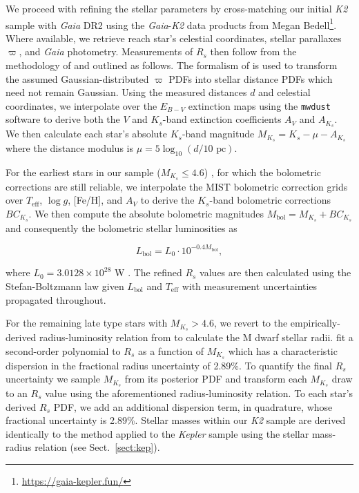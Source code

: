 \documentclass[twocolumn]{emulateapj}
\newcommand{\gaia}[1]{\emph{Gaia}#1}
\newcommand{\kepler}[1]{\emph{Kepler}#1}
\newcommand{\ktwo}[1]{\emph{K2}#1}
\newcommand{\teff}[1]{$T_{\text{eff}}$#1}
\newcommand{\logg}[1]{$\log{g}$#1}
\begin{document}
We proceed with refining the stellar parameters by cross-matching our initial \ktwo{} sample with \gaia{}  
DR2 using the \gaia{-}\ktwo{} data products from Megan Bedell\footnote{\url{https://gaia-kepler.fun/}}. Where
available, we retrieve reach star's celestial coordinates, stellar parallaxes $\varpi$, and \gaia{} photometry.
Measurements of $R_s$ then follow from the methodology of \cite{berger18} and outlined as follows.
The formalism of \cite{bailerjones18} is used to transform the assumed
Gaussian-distributed $\varpi$ PDFs into stellar distance PDFs which need not remain Gaussian.
Using the measured distances $d$ and celestial coordinates, we interpolate over the $E_{B-V}$ extinction maps using the
\texttt{mwdust} software \citep{bovy16} to derive both the $V$ and $K_s$-band extinction coefficients $A_V$ and
$A_{K_s}$. We then calculate each star's absolute $K_s$-band magnitude $M_{K_s} = K_s - \mu - A_{K_s}$ where
the distance modulus is $\mu = 5\log_{10}(d/10\text{ pc})$.

For the earliest stars in our sample ($M_{K_s}\leq 4.6$) , for which the bolometric corrections
are still reliable, we interpolate the MIST bolometric correction grids \citep{choi16} over \teff{,} \logg{,} [Fe/H],
and $A_V$ to derive the $K_s$-band bolometric corrections $BC_{K_s}$. We then compute the
absolute bolometric magnitudes $M_{\text{bol}}=M_{K_s} + BC_{K_s}$ and consequently the bolometric stellar
luminosities as 

\begin{equation}
  L_{\text{bol}} = L_0 \cdot 10^{-0.4 M_{\text{bol}}},
\end{equation}

\noindent where $L_0 = 3.0128 \times 10^{28}$ W \citep{mamajek15}. The refined $R_s$ values
are then calculated using the Stefan-Boltzmann law given $L_{\text{bol}}$ and \teff{} with measurement uncertainties
propagated throughout.

For the remaining late type stars with $M_{K_s}>4.6$, we revert to the empirically-derived radius-luminosity relation
from \cite{mann15} to calculate the M dwarf stellar radii. \cite{mann15} fit a second-order polynomial to $R_s$ as
a function of $M_{K_s}$ which has a characteristic dispersion in the fractional radius uncertainty of 2.89\%. To quantify
the final $R_s$ uncertainty we sample $M_{K_s}$ from its posterior PDF and transform each $M_{K_s}$ draw to an $R_s$ value
using the aforementioned radius-luminosity relation. To each star's derived $R_s$ PDF, we add an additional
dispersion term, in quadrature, whose fractional uncertainty is 2.89\%. Stellar masses within our \ktwo{} sample are derived
identically to the method applied to the \kepler{} sample using the \cite{boyajian12} stellar
mass-radius relation (see Sect.~\ref{sect:kep}). 
\end{document}
